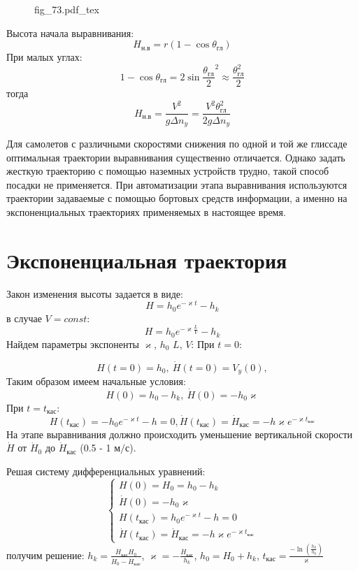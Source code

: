 \documentclass{article}
\begin{document}
\begin{figure}[H]
    \centering
    {fig_73.pdf_tex}
\end{figure}


Высота начала выравнивания:
\[
    H_{н.в}    = r (1 - \cos{\theta_{гл}})
\]
При малых углах:
\[
    1 - \cos{\theta_{гл}}= 2 \sin{\frac{\theta_{гл}}{2}}^2 \approx
    \frac{\theta_{гл}^2}{ 2}
\]
тогда 
\[
    H_{н.в} = \frac{V^2}{g \Delta n_y} =\frac{V^2 \theta_{гл}^2}{2g \Delta n_y}
\]

Для самолетов с различными скоростями снижения по одной и той же глиссаде
оптимальная траектории выравнивания существенно отличается. Однако задать
жесткую траекторию с помощью наземных устройств трудно, такой способ посадки не
применяется. При автоматизации этапа выравнивания используются траектории
задаваемые с помощью бортовых средств информации, а именно на экспоненциальных
траекториях применяемых в настоящее время. 
\section{Экспоненциальная траектория}
Закон изменения высоты задается в виде:
\[
    H = h_0 e^{-\varkappa t } - h_k
\]
в случае $V = const$:
\[
    H = h_0 e^{-\varkappa \frac{L}{V}} - h_k
\]
Найдем параметры экспоненты $\varkappa$, $h_0$ $L$, $V$:
При $t = 0$:

\[
    H(t=0) = h_0, \ \dot{H}(t = 0) =  V_y (0), 
\]
Таким образом имеем начальные условия:
\[
    H(0) = h_0 - h_{k},\ \dot{H}(0) = -h_0 \varkappa
\]
При $t = t_{кас}$:
\[
    H(t_{кас}) = - h_0 e^{-\varkappa t} - h = 0, \dot{H}(t_{кас}) =
    \dot{H}_{кас} = - h \varkappa e^{- \varkappa t_{кас}}
\]
На этапе выравнивания должно происходить уменьшение вертикальной скорости
$\dot{H}$ от $\dot{H}_0$ до $\dot{H}_{кас}$ (0.5 - 1 $м/с$).

Решая систему дифференциальных уравнений: 
\begin{equation}
    \begin{cases}
        H(0) = H_0 = h_0 - h_k \\
        \dot{H}(0) = - h_0 \varkappa \\
        H(t_{кас}) = h_0 e^{-\varkappa t} - h = 0 \\
        \dot{H}(t_{кас}) = \dot{H}_{кас} = -h \varkappa e^{-\varkappa t_{кас}}
    \end{cases}
\end{equation}
получим решение:
$h_k = \frac{\dot{H}_{кас} H_0}{\dot{H}_0 - \dot{H}_{кас}}$, $\varkappa = -
\frac{\dot{H}_{кас}}{h_k}$, $h_0 = H_0 + h_k$, $t_{кас} = \frac{-
\ln(\frac{h_k}{h_0})}{\varkappa}$
\end{document}
